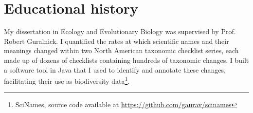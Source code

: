 
\newpage

\part{Educational history}


My dissertation in Ecology and Evolutionary Biology was supervised by Prof. Robert Guralnick. I quantified the rates at which scientific names and their meanings changed within two North American taxonomic checklist series, each made up of dozens of checklists containing hundreds of taxonomic changes. I built a software tool in Java that I used to identify and annotate these changes, facilitating their use as biodiversity data\footnote{SciNames, source code available at \url{https://github.com/gaurav/scinames}}.

